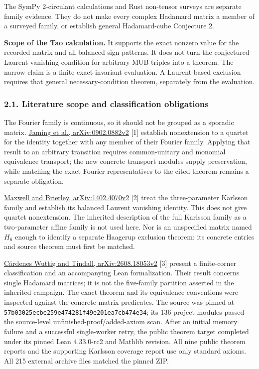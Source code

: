 \documentclass[
]{article}
\begin{document}
The SymPy 2-circulant calculations and Rust non-tensor surveys are
separate family evidence. They do not make every complex Hadamard matrix
a member of a surveyed family, or establish general Hadamard-cube
Conjecture 2.

\textbf{Scope of the Tao calculation.} It supports the exact nonzero
value for the recorded matrix and all balanced sign patterns. It does
not turn the conjectured Laurent vanishing condition for arbitrary MUB
triples into a theorem. The narrow claim is a finite exact invariant
evaluation. A Laurent-based exclusion requires that general
necessary-condition theorem, separately from the evaluation.

\subsubsection{2.1. Literature scope and classification
obligations}\label{literature-scope-and-classification-obligations}

The Fourier family is continuous, so it should not be grouped as a
sporadic matrix. \href{https://arxiv.org/abs/0902.0882v2}{Jaming et al.,
arXiv:0902.0882v2} {[}1{]} establish nonextension to a quartet for the
identity together with any member of their Fourier family. Applying that
result to an arbitrary transition requires common-unitary and monomial
equivalence transport; the new concrete transport modules supply
preservation, while matching the exact Fourier representatives to the
cited theorem remains a separate obligation.

\href{https://arxiv.org/abs/1402.4070v2}{Maxwell and Brierley,
arXiv:1402.4070v2} {[}2{]} treat the three-parameter Karlsson family and
establish its balanced Laurent vanishing identity. This does not give
quartet nonextension. The inherited description of the full Karlsson
family as a two-parameter affine family is not used here. Nor is an
unspecified matrix named \(H_6\) enough to identify a separate Haagerup
exclusion theorem: its concrete entries and source theorem must first be
matched.

\href{https://arxiv.org/abs/2608.18053v2}{Cárdenes Wuttig and Tindall,
arXiv:2608.18053v2} {[}3{]} present a finite-corner classification and
an accompanying Lean formalization. Their result concerns single
Hadamard matrices; it is not the five-family partition asserted in the
inherited campaign. The exact theorem and its equivalence conventions
were inspected against the concrete matrix predicates. The source was
pinned at \nolinkurl{57b03025ecbe259e474281f49e201ea7cb474e34}; its 136
project modules passed the source-level unfinished-proof/added-axiom
scan. After an initial memory failure and a successful single-worker
retry, the public theorem target completed under its pinned Lean
4.33.0-rc2 and Mathlib revision. All nine public theorem reports and the
supporting Karlsson coverage report use only standard axioms. All 215
external archive files matched the pinned ZIP.
\end{document}
